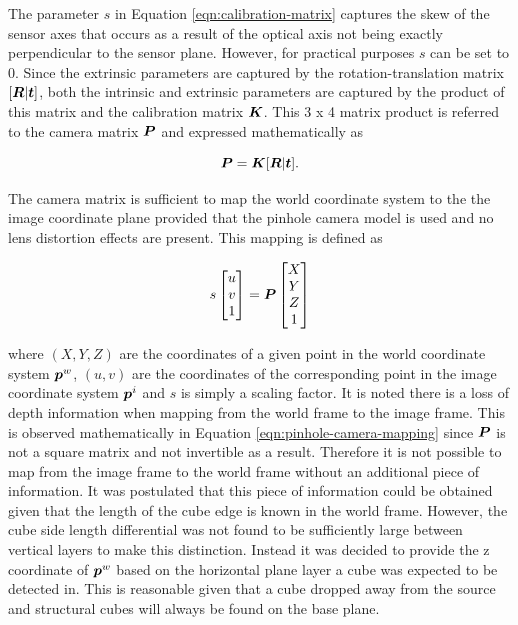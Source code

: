 The parameter $s$ in Equation \ref{eqn:calibration-matrix} captures the skew of the sensor axes that occurs as a result of the optical axis not being exactly perpendicular to the sensor plane. However, for practical purposes $s$ can be set to 0. Since the extrinsic parameters are captured by the rotation-translation matrix $[\bm{R}|\bm{t}]$, both the intrinsic and extrinsic parameters are captured by the product of this matrix and the calibration matrix $\bm{K}$. This 3 x 4 matrix product is referred to the camera matrix $\bm{P}$ and expressed mathematically as

\begin{equation}
	\bm{P}=\bm{K}[\bm{R}|\bm{t}].
	\label{eqn:camera-matrix}
\end{equation}

The camera matrix is sufficient to map the world coordinate system to the the image coordinate plane provided that the pinhole camera model is used and no lens distortion effects are present. This mapping is defined as

\begin{equation}
	s
	\begin{bmatrix}
		u \\ 
		v \\ 
		1
	\end{bmatrix}
	=
	\bm{P}
	\begin{bmatrix}
		X \\ 
		Y \\ 
		Z \\
		1
	\end{bmatrix}
	\label{eqn:pinhole-camera-mapping}
\end{equation}

where $(X,Y,Z)$ are the coordinates of a given point in the world coordinate system $\bm{p}^w$, $(u,v)$ are the coordinates of the corresponding point in the image coordinate system $\bm{p}^i$ and $s$ is simply a scaling factor. It is noted there is a loss of depth information when mapping from the world frame to the image frame. This is observed mathematically in Equation \ref{eqn:pinhole-camera-mapping} since $\bm{P}$ is not a square matrix and not invertible as a result. Therefore it is not possible to map from the image frame to the world frame without an additional piece of information. It was postulated that this piece of information could be obtained given that the length of the cube edge is known in the world frame. However, the cube side length differential was not found to be sufficiently large between vertical layers to make this distinction. Instead it was decided to provide the z coordinate of $\bm{p}^w$ based on the horizontal plane layer a cube was expected to be detected in. This is reasonable given that a cube dropped away from the source and structural cubes will always be found on the base plane.

